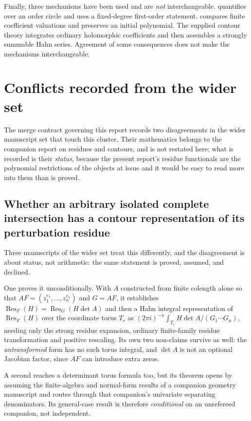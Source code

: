 \documentclass[11pt,letterpaper]{article}
\numberwithin{equation}{section}
\theoremstyle{definition}
\theoremstyle{remark}\newtheorem{remark}[theorem]{Remark}
\newcommand{\Res}{\operatorname{Res}}
\begin{document}
Finally, three mechanisms have been used and are \emph{not} interchangeable.
 quantifies over an order circle and uses a
fixed-degree first-order statement.  compares
finite coefficient valuations and preserves an initial polynomial. The
supplied contour theory integrates ordinary holomorphic coefficients and then
assembles a strongly summable Hahn series. Agreement of some consequences does
not make the mechanisms interchangeable.

\section{Conflicts recorded from the wider set}\label{polynomial:sec:conflicts}
The merge contract governing this report records two disagreements in the
wider manuscript set that touch this cluster. Their mathematics belongs to the
companion report on residues and contours, and is not restated here; what is
recorded is their \emph{status}, because the present report's residue
functionals are the polynomial restrictions of the objects at issue and it
would be easy to read more into them than is proved.

\subsection{Whether an arbitrary isolated complete intersection has a contour
representation of its perturbation residue}
Three manuscripts of the wider set treat this differently, and the
disagreement is about status, not arithmetic: the same statement is proved,
assumed, and declined.

One proves it unconditionally. With $A$ constructed from finite colength alone
so that $AF=(z_1^{e_1},\ldots,z_n^{e_n})$ and $G=AF$, it establishes
$\Res_F(H)=\Res_G(H\det A)$ and then a Hahn integral representation of
$\Res_F(H)$ over the coordinate torus $T_r$ as
$(2\pi i)^{-n}\int_{T_r}H\det A/(G_1\cdots G_n)$, needing only the strong
residue expansion, ordinary finite-family residue transformation and positive
rescaling. Its own two non-claims survive as well: the \emph{untransformed}
form has no such torus integral, and $\det A$ is not an optional Jacobian
factor, since $AF$ can introduce extra zeros.

A second reaches a determinant torus formula too, but its theorem opens by
assuming the finite-algebra and normal-form results of a companion geometry
manuscript and routes through that companion's univariate separating
denominators. Its general-case result is therefore \emph{conditional} on an
unrefereed companion, not independent.
\end{document}
